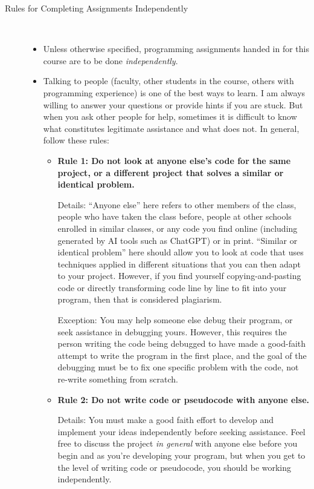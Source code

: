 \documentclass [letterpaper,11pt]{article}
\begin{document}
\begin{description}
\item[Rules for Completing Assignments Independently]\
\begin{itemize}
        \item Unless otherwise specified, programming assignments handed in for this course are to be done \emph{independently}.  
        \item Talking to people (faculty, other students in the course, others with programming experience) is one of the best ways to learn.  I am always willing to answer your questions or provide hints if you are stuck.  But when you ask other people for help, sometimes
        it is difficult to know what constitutes legitimate assistance and what does not.  In general, follow these rules:
        
        \begin{itemize}
                \item \textbf{Rule 1: Do not look at anyone else's code for the same project, or a different project that solves a similar 
                or identical problem.}
                
                Details: ``Anyone else'' here refers to other members of the class, people who have taken the class before, people at other
                schools enrolled in similar classes, or any code you find online (including generated by AI tools such as ChatGPT) or in print.  ``Similar or identical problem'' here should 
                allow you to look at code that uses techniques applied in different situations that you can then 
                adapt to your project.  However, if you find yourself copying-and-pasting code or directly transforming
                code line by line to fit into your program, then that is considered plagiarism.
                
                                
                Exception: You may help someone else debug their program, or seek assistance in debugging yours.  However, 
                this requires the person writing the code being debugged to have made a good-faith attempt
                to write the program in the first place, and the goal of the debugging must be to fix
                one specific problem with the code, not re-write something from scratch.
                
                \item \textbf{Rule 2: Do not write code or pseudocode with anyone else.}
                
                Details: You must make a good faith effort to develop and implement your ideas
                independently before seeking assistance.  Feel free to discuss the project \emph{in general} with anyone else
                before you begin and as you're developing your program, but when you get to the level of writing code or
                pseudocode, you should be working independently.
                

\end{itemize}
\end{itemize}
\end{description}
\end{document}

